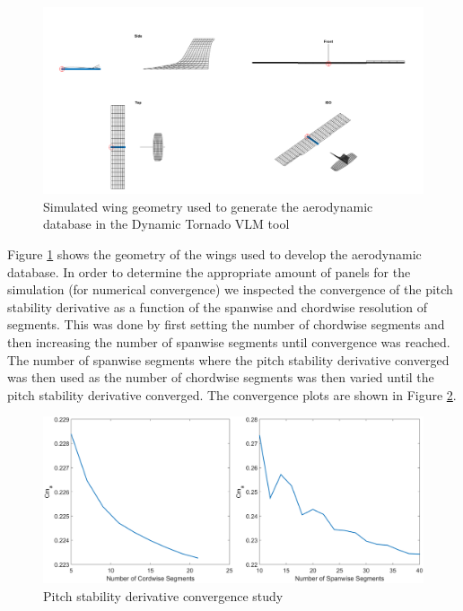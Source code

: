 \documentclass[11pt]{ucthesis}
\begin{document}
\begin{figure}[h]
\centering
\includegraphics[width=1\linewidth]{Figures/SimulationMultiAngleView.png}
\caption{Simulated wing geometry used to generate the aerodynamic database in the Dynamic Tornado VLM tool}
\label{fig:AmultiAngle}
\end{figure}

Figure \ref{fig:AmultiAngle} shows the geometry of the wings used to develop the aerodynamic database. In order to determine the appropriate amount of panels for the simulation (for numerical convergence) we inspected the convergence of the pitch stability derivative as a function of the spanwise and chordwise resolution of segments. This was done by first setting the number of chordwise segments and then increasing the number of spanwise segments until convergence was reached. The number of spanwise segments where the pitch stability derivative converged was then used as the number of chordwise segments was then varied until the pitch stability derivative converged. The convergence plots are shown in Figure \ref{fig:Aconverge}. 

\begin{figure}[h]
\centering
\includegraphics[width=1\linewidth]{Figures/SegmentConverge.png}
\caption{Pitch stability derivative convergence study}
\label{fig:Aconverge}
\end{figure}
\end{document}
